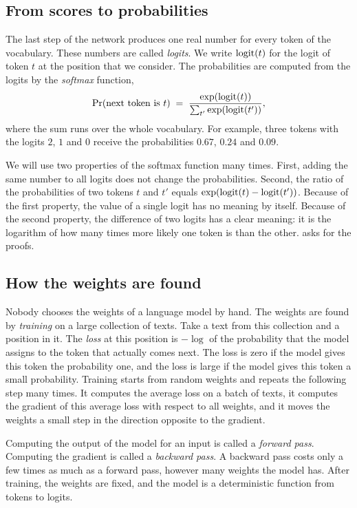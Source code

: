 \subsection{From scores to probabilities}

The last step of the network produces one real number for every token of the vocabulary. These numbers are
called \emph{logits}. We write $\mathrm{logit}(t)$ for the logit of token $t$ at the position that we consider. The
probabilities are computed from the logits by the \emph{softmax} function,
\begin{equation}\label{eq:softmax}
\Pr(\text{next token is }t) \;=\; \frac{\exp(\mathrm{logit}(t))}{\sum_{t'}\exp(\mathrm{logit}(t'))},
\end{equation}
where the sum runs over the whole vocabulary. For example, three tokens with the logits $2$, $1$ and $0$ receive
the probabilities $0.67$, $0.24$ and $0.09$.

We will use two properties of the softmax function many times. First, adding the same number to all logits does
not change the probabilities. Second, the ratio of the probabilities of two tokens $t$ and $t'$ equals
$\exp(\mathrm{logit}(t)-\mathrm{logit}(t'))$. Because of the first property, the value of a single logit has no meaning by itself.
Because of the second property, the difference of two logits has a clear meaning: it is the logarithm of how many
times more likely one token is than the other.  asks for the proofs.

\subsection{How the weights are found}

Nobody chooses the weights of a language model by hand. The weights are found by \emph{training} on a large
collection of texts. Take a text from this collection and a position in it. The \emph{loss} at this position is
$-\log$ of the probability that the model assigns to the token that actually comes next. The loss is zero if the
model gives this token the probability one, and the loss is large if the model gives this token a small
probability. Training starts from random weights and repeats the following step many times. It computes the
average loss on a batch of texts, it computes the gradient of this average loss with respect to all weights, and
it moves the weights a small step in the direction opposite to the gradient.

Computing the output of the model for an input is called a \emph{forward pass}. Computing the gradient is called
a \emph{backward pass}. A backward pass costs only a few times as much as a forward pass, however many weights the
model has. After training, the weights are fixed, and the model is a deterministic function from tokens to
logits.

